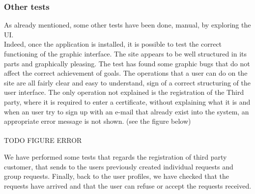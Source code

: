 \subsubsection{Other tests}
As already mentioned, some other tests have been done, manual, by exploring the UI. \\ 
Indeed, once the application is installed, it is possible to test the correct functioning of the graphic interface. 
The site appears to be well structured in its parts and graphically pleasing. 
The test has found some graphic bugs that do not affect the correct achievement of goals. 
The operations that a user can do on the site are all fairly clear and easy to understand, sign of a correct structuring of the user
interface.
The only operation not explained is the registration of the Third party, where it is required to enter a certificate, without explaining what
it is and when an user try to sign up with an e-mail that already exist into the system, an appropriate error message is not shown. (see the figure below)\\
\\
TODO FIGURE ERROR

We have performed some tests that regards the registration of third party customer, that sends to the users previously
created individual requests and group requests. Finally, back to the user profiles, we have checked that the requests have arrived and that
the user can refuse or accept the requests received.
